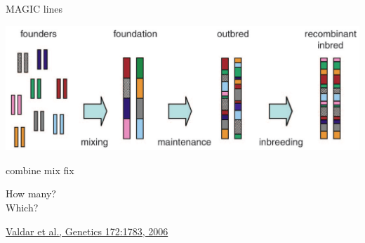 \documentclass[12pt]{article}
\newcommand{\citesize}{\fontsize{14}{18} \selectfont}
\newcommand{\headsize}{\fontsize{35}{35} \selectfont}
\newcommand{\smallsize}{\fontsize{25}{30} \selectfont}
\newcommand{\smallersize}{\fontsize{20}{25} \selectfont}
\begin{document}
\newpage

\addtocounter{page}{-1}

\headsize \color{myyellow}
\hfill \begin{minipage}{5.75in}
\centering
MAGIC lines
\end{minipage}

\vspace{20mm}

\centerline{\includegraphics[width=10in]{Figs/valdar_genet2006.png}}

\smallsize \color{myyellow}
\hspace*{52mm} combine \hspace*{35mm} mix \hspace*{52mm} fix

\smallersize
\color{mywhite}
\vspace{20pt}

\hspace*{6mm}
\begin{minipage}[t]{45mm}
\vspace*{0mm}
\centering

How many? \\[20pt]
Which?
\end{minipage}
\hspace{57mm}
\begin{minipage}[t]{45mm}
\vspace*{0mm}
\centering

\end{minipage}
\hspace{18mm}
\begin{minipage}[t]{45mm}
\vspace*{0mm}
\centering


\end{minipage}


\vfill

\hfill {\citesize \color{citecolor} \href{http://www.genetics.org/content/172/3/1783.full}{Valdar et al., Genetics 172:1783, 2006}}

\vspace*{5mm}
\end{document}
